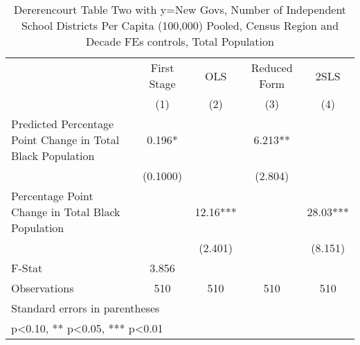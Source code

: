 \begin{table}[htbp]\centering
\def\sym#1{\ifmmode^{#1}\else\(^{#1}\)\fi}
\caption{Dererencourt Table Two with y=New Govs, Number of Independent School Districts Per Capita (100,000) Pooled, Census Region and Decade FEs controls, Total Population}
\begin{tabular}{l*{4}{c}}
\toprule
                    & First Stage   &         OLS   &Reduced Form   &        2SLS   \\
                    &\multicolumn{1}{c}{(1)}   &\multicolumn{1}{c}{(2)}   &\multicolumn{1}{c}{(3)}   &\multicolumn{1}{c}{(4)}   \\
\midrule
Predicted Percentage Point Change in Total Black Population&       0.196*  &               &       6.213** &               \\
                    &    (0.1000)   &               &     (2.804)   &               \\
\addlinespace
Percentage Point Change in Total Black Population&               &       12.16***&               &       28.03***\\
                    &               &     (2.401)   &               &     (8.151)   \\
\midrule
F-Stat              &       3.856   &               &               &               \\
Observations        &         510   &         510   &         510   &         510   \\
\bottomrule
\multicolumn{5}{l}{\footnotesize Standard errors in parentheses}\\
\multicolumn{5}{l}{\footnotesize * p<0.10, ** p<0.05, *** p<0.01}\\
\end{tabular}
\end{table}
